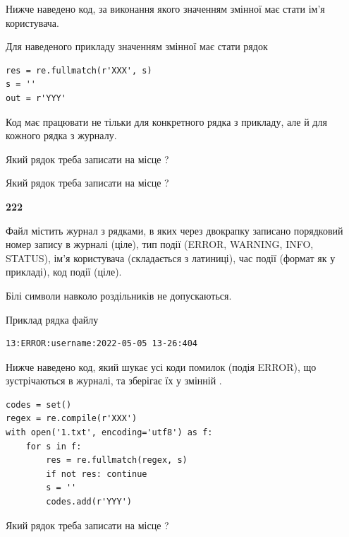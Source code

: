 Нижче наведено код, за виконання якого значенням змінної  має стати ім'я користувача.

Для наведеного прикладу значенням змінної  має стати рядок 



\begin{verbatim}
res = re.fullmatch(r'XXX', s)
s = ''
out = r'YYY'
\end{verbatim}


Код має працювати не тільки для конкретного рядка з прикладу, але й для кожного рядка з журналу.




Який рядок треба записати на місце  ?\par
\vspace{5mm}


Який рядок треба записати на місце  ?\par


\newpage

{\begin {center}\textbf{ 222}\end {center}}\par
Файл  містить журнал з рядками, в яких через двокрапку записано поряд\-ко\-вий номер запису в журналі (ціле), тип події (ERROR, WARNING, INFO, STATUS), ім'я користувача (складається з латиниці), час події (фор\-мат як у прикладі), код події (ціле).

Білі символи навколо роздільників не допускаються.

Приклад рядка файлу



\begin{verbatim}
13:ERROR:username:2022-05-05 13-26:404
\end{verbatim}


Нижче наведено код, який шукає усі коди помилок (подія ERROR), що зустріча\-ють\-ся в журналі, та зберігає їх у змінній .



\begin{verbatim}
codes = set()
regex = re.compile(r'XXX')
with open('1.txt', encoding='utf8') as f:
    for s in f:
        res = re.fullmatch(regex, s)
        if not res: continue
        s = ''
        codes.add(r'YYY')
\end{verbatim}





Який рядок треба записати на місце  ?\par
\vspace{5mm}


